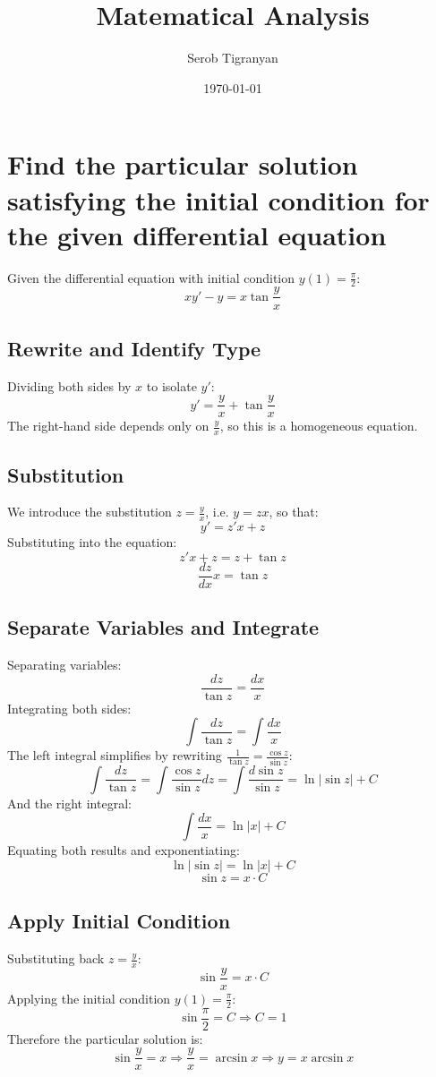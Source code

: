 \documentclass[11pt]{article}
\author{Serob Tigranyan}
\date{\today}
\title{Matematical Analysis}
\begin{document}
\maketitle
\tableofcontents

\newpage
\section{Find the particular solution satisfying the initial condition for the given differential equation}
\label{sec:orgc1e0b05}
Given the differential equation with initial condition \(y(1) = \frac{\pi}{2}\):
\[
xy' - y = x \tan{\frac{y}{x}}
\]
\subsection{Rewrite and Identify Type}
\label{sec:org892aee9}
Dividing both sides by \(x\) to isolate \(y'\):
\[
y' = \frac{y}{x} + \tan{\frac{y}{x}}
\]
The right-hand side depends only on \(\frac{y}{x}\), so this is a homogeneous equation.
\subsection{Substitution}
\label{sec:org9dd7862}
We introduce the substitution \(z = \frac{y}{x}\), i.e. \(y = zx\), so that:
\[
y'=z'x+z
\]
Substituting into the equation:
\[
z'x+z=z+\tan{z}
\]
\[
\frac{dz}{dx}x=\tan{z}
\]
\subsection{Separate Variables and Integrate}
\label{sec:org1d7dabc}
Separating variables:
\[
\frac{dz}{\tan{z}} = \frac{dx}{x}
\]
Integrating both sides:
\[
\int{\frac{dz}{\tan{z}}} = \int{\frac{dx}{x}}
\]
The left integral simplifies by rewriting \(\frac{1}{\tan z} = \frac{\cos z}{\sin z}\):
\[
\int{\frac{dz}{\tan{z}}} = \int{\frac{\cos{z}}{\sin{z}} dz} = \int{\frac{d \sin{z}}{\sin{z}}} = \ln{\left| \sin{z} \right|} + C
\]
And the right integral:
\[
\int{\frac{dx}{x}} = \ln{\left| x \right|} + C
\]
Equating both results and exponentiating:
\[
\ln{\left| \sin{z} \right|} = \ln{\left| x \right|}+C
\]
\[
\sin{z} = x \cdot C
\]
\subsection{Apply Initial Condition}
\label{sec:orgc21b777}
Substituting back \(z = \frac{y}{x}\):
\[
\sin{\frac{y}{x}} = x \cdot C
\]
Applying the initial condition \(y(1) = \frac{\pi}{2}\):
\[
\sin{\frac{\pi}{2}} = C \Rightarrow C = 1
\]
Therefore the particular solution is:
\[
\sin{\frac{y}{x}} = x \Rightarrow \frac{y}{x} = \arcsin{x} \Rightarrow \boxed{y = x \arcsin{x}}
\]
\end{document}
